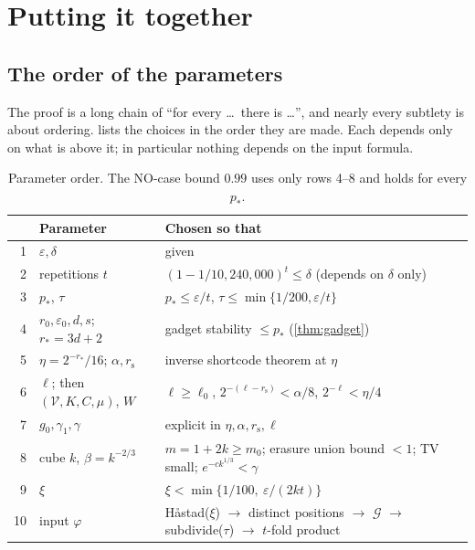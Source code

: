 \documentclass[11pt]{article}
\theoremstyle{definition}
\theoremstyle{remark}
\newcommand{\eps}{\varepsilon}
\newcommand{\V}{\mathcal V}
\newcommand{\cG}{\mathcal G}
\newcommand{\rs}{r_{\mathrm s}}
\begin{document}
\section{Putting it together}\label{sec:finish}

\subsection{The order of the parameters}

The proof is a long chain of ``for every \dots\ there is \dots'', and nearly
every subtlety is about ordering.  lists the choices in the
order they are made. Each depends only on what is above it; in particular
nothing depends on the input formula.

\begin{table}[h]
\centering\small
\renewcommand{\arraystretch}{1.25}
\begin{tabular}{@{}r>{\raggedright}p{3.4cm}>{\raggedright\arraybackslash}p{8.2cm}@{}}
\toprule
& \textbf{Parameter} & \textbf{Chosen so that} \\
\midrule
1 & $\eps,\delta$ & given \\
2 & repetitions $t$ & $(1-1/10{,}240{,}000)^t\le\delta$ (depends on $\delta$ only)\\
3 & $p_*$, $\tau$ & $p_*\le\eps/t$, $\tau\le\min\{1/200,\eps/t\}$\\
4 & $r_0,\eps_0,d,s$; $r_*=3d+2$ & gadget stability $\le p_*$ (\cref{thm:gadget})\\
5 & $\eta=2^{-r_*}/16$; $\alpha,\rs$ & inverse shortcode theorem at $\eta$\\
6 & $\ell$; then $(\V,K,C,\mu)$, $W$ & $\ell\ge\ell_0$, $2^{-(\ell-\rs)}<\alpha/8$, $2^{-\ell}<\eta/4$\\
7 & $g_0,\gamma_1,\gamma$ & explicit in $\eta,\alpha,\rs,\ell$\\
8 & cube $k$, $\beta=k^{-2/3}$ & $m=1+2k\ge m_0$; erasure union bound $<1$; TV small; $e^{-ck^{1/3}}<\gamma$\\
9 & $\xi$ & $\xi<\min\{1/100,\ \eps/(2kt)\}$\\
10 & input $\varphi$ & H{\aa}stad($\xi$) $\to$ distinct positions $\to$ $\cG$ $\to$ subdivide($\tau$) $\to$ $t$-fold product\\
\bottomrule
\end{tabular}
\caption{Parameter order. The NO-case bound $0.99$ uses only rows 4--8 and holds for every $p_*$.}
\label{tab:params}
\end{table}
\end{document}
